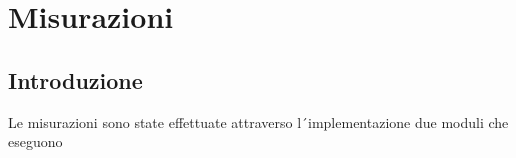 \section{Misurazioni}

\subsection{Introduzione} %

Le misurazioni sono state effettuate attraverso l´implementazione due moduli che eseguono 